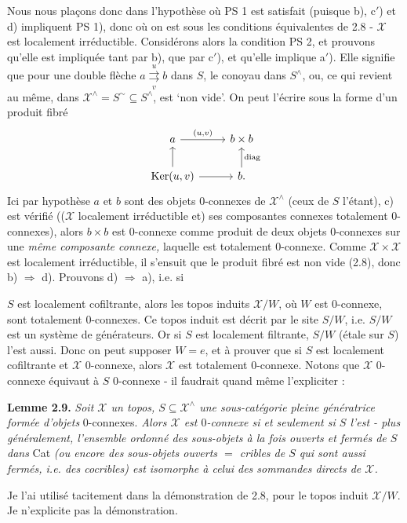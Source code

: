 \documentclass[11pt]{article}
\newcommand{\printedpage}[1]{\marginpar{\footnotesize p.~#1}}
\newcommand{\msp}[1]{\marginpar{\footnotesize [#1]}}
\newcommand{\X}{\mathscr{X}}
\begin{document}
\msp{page 24}Nous nous plaçons donc dans l'hypothèse où PS 1 est satisfait (puisque b), c$'$) et d) impliquent PS 1), donc où on est sous les conditions équivalentes de 2.8 - $\X$ est localement irréductible. Considérons alors la condition PS 2, et prouvons qu'elle est impliquée tant par b), que par c$'$), et qu'elle implique a$'$). Elle signifie que pour une double flèche $a\overset{u}{\underset{v}{\rightrightarrows}}b$ dans $S$, le conoyau dans $S^\wedge$, ou, ce qui revient au même, dans $\X^\wedge=S^\sim\subseteq S^\wedge$, est `non vide'. On peut l'écrire sous la forme d'un produit fibré
\[
\begin{tikzcd}
a \arrow[r, "{\scriptstyle (u,v)}"] & b\times b \\
\operatorname{Ker}(u,v) \arrow[u] \arrow[r] & b. \arrow[u, "\mathrm{diag}"']
\end{tikzcd}
\]
Ici par hypothèse $a$ et $b$ sont des objets 0-connexes de $\X^\wedge$ (ceux de $S$ l'étant), c) est vérifié (($\X$ localement irréductible et) ses composantes connexes totalement 0-connexes), alors $b\times b$ est 0-connexe comme produit de deux objets 0-connexes sur une \textit{même composante connexe,} laquelle est totalement 0-connexe. Comme $\X\times\X$ est localement irréductible, il s'ensuit que le produit fibré est non vide (2.8), donc b) $\Longrightarrow$ d). Prouvons d) $\Longrightarrow$ a), i.e. si

\msp{page 25}$S$ est localement cofiltrante, alors les topos induits $\X/W$, où $W$ est 0-connexe, sont totalement 0-connexes. Ce topos induit est décrit par le site $S/W$, i.e. $S/W$ est un système de générateurs. Or si $S$ est localement filtrante, $S/W$ (étale sur $S$) l'est aussi. Donc on peut supposer $W=e$, et à prouver que si $S$ est localement cofiltrante et $\X$ 0-connexe, alors $\X$ est totalement 0-connexe. Notons que $\X$ 0-connexe équivaut à $S$ 0-connexe - il faudrait quand même l'expliciter :

\textbf{Lemme 2.9.} \textit{Soit $\X$ un topos, $S\subseteq\X^\wedge$ une sous-catégorie pleine génératrice formée d'objets} 0-connexes. \textit{Alors $\X$ est $0$-connexe si et seulement si $S$ l'est - plus généralement, l'ensemble ordonné des sous-objets à la fois ouverts et fermés de $S$ dans} Cat \textit{(ou encore des
\printedpage{16}
sous-objets ouverts $=$ cribles de $S$ qui sont aussi fermés, i.e. des cocribles) est isomorphe à celui des sommandes directs de $\X$.}

Je l'ai utilisé tacitement dans la démonstration de 2.8, pour le topos induit $\X/W$. Je n'explicite pas la démonstration.
\end{document}
